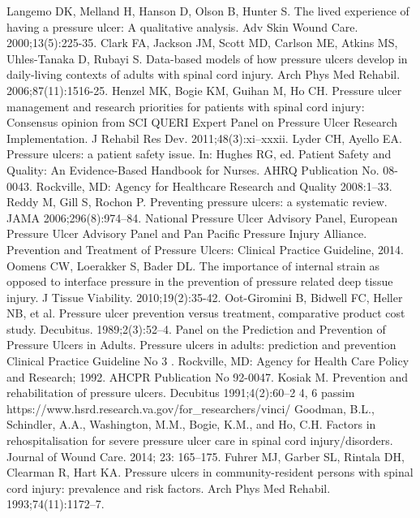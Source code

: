 \documentclass{amia}
\begin{document}
{\begin{thebibliography}{1}
Langemo DK, Melland H, Hanson D, Olson B, Hunter S. The lived experience of having a pressure ulcer: A qualitative analysis. Adv Skin Wound Care. 2000;13(5):225-35.
Clark FA, Jackson JM, Scott MD, Carlson ME, Atkins MS, Uhles-Tanaka D, Rubayi S. Data-based models of how pressure ulcers develop in daily-living contexts of adults with spinal cord injury. Arch Phys Med Rehabil. 2006;87(11):1516-25.
Henzel MK, Bogie KM, Guihan M, Ho CH. Pressure ulcer management and research priorities for patients with spinal cord injury: Consensus opinion from SCI QUERI Expert Panel on Pressure Ulcer Research Implementation. J Rehabil Res Dev. 2011;48(3):xi–xxxii.
Lyder CH, Ayello EA. Pressure ulcers: a patient safety issue. In: Hughes RG, ed. Patient Safety and Quality: An Evidence-Based Handbook for Nurses. AHRQ Publication No. 08-0043. Rockville, MD: Agency for Healthcare Research and Quality 2008:1–33.
Reddy M, Gill S, Rochon P. Preventing pressure ulcers: a systematic review. JAMA 2006;296(8):974–84.
National Pressure Ulcer Advisory Panel, European Pressure Ulcer Advisory Panel and Pan Pacific Pressure Injury Alliance. Prevention and Treatment of Pressure Ulcers: Clinical Practice Guideline, 2014.
Oomens CW, Loerakker S, Bader DL. The importance of internal strain as opposed to interface pressure in the prevention of pressure related deep tissue injury. J Tissue Viability. 2010;19(2):35-42.
Oot-Giromini B, Bidwell FC, Heller NB, et al. Pressure ulcer prevention versus treatment, comparative product cost study. Decubitus. 1989;2(3):52–4.
Panel on the Prediction and Prevention of Pressure Ulcers in Adults. Pressure ulcers in adults: prediction and prevention Clinical Practice Guideline No 3 . Rockville, MD: Agency for Health Care Policy and Research; 1992. AHCPR Publication No 92-0047.
Kosiak M. Prevention and rehabilitation of pressure ulcers. Decubitus 1991;4(2):60–2 4, 6 passim
https://www.hsrd.research.va.gov/for\_researchers/vinci/
Goodman, B.L., Schindler, A.A., Washington, M.M., Bogie, K.M., and Ho, C.H. Factors in rehospitalisation for severe pressure ulcer care in spinal cord injury/disorders. Journal of Wound Care. 2014; 23: 165–175.
Fuhrer MJ, Garber SL, Rintala DH, Clearman R, Hart KA. Pressure ulcers in community-resident persons with spinal cord injury: prevalence and risk factors. Arch Phys Med Rehabil. 1993;74(11):1172–7.

\end{thebibliography}}
\end{document}
